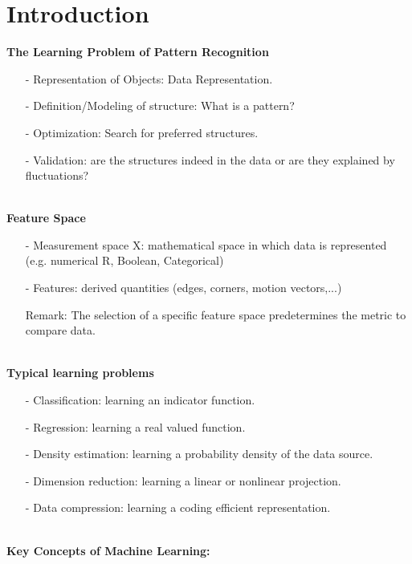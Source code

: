 \section{Introduction}
\textbf{The Learning Problem of Pattern Recognition}
\begin{itemize}
    \item[-]Representation of Objects: Data Representation.
    \item[-]Definition/Modeling of structure: What is a pattern?
    \item[-]Optimization: Search for preferred structures.
    \item[-]Validation: are the structures indeed in the data or are they explained by fluctuations?
\end{itemize}{}
\\
\textbf{Feature Space}
\begin{itemize}
    \item[-]Measurement space X: mathematical space in which data is represented (e.g. numerical R, Boolean, Categorical)
    \item[-]Features: derived quantities (edges, corners, motion vectors,...)
    \item[]Remark: The selection of a specific feature space predetermines the metric to compare data.
\end{itemize}
\\
\textbf{Typical learning problems}
\begin{itemize}
    \item[-]Classification: learning an indicator function.
    \item[-]Regression: learning a real valued function.
    \item[-]Density estimation: learning a probability density of the data source.
    \item[-]Dimension reduction: learning a linear or nonlinear projection.
    \item[-]Data compression: learning a coding efficient representation.
\end{itemize}{}
\\
\textbf{Key Concepts of Machine Learning:}

